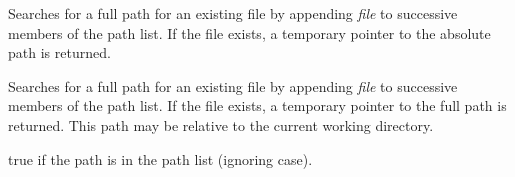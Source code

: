 

Searches for a full path for an existing file by appending {\it file} to
successive members of the path list.  If the file exists, a temporary
pointer to the absolute path is returned.



Searches for a full path for an existing file by appending {\it file} to
successive members of the path list.  If the file exists, a temporary
pointer to the full path is returned. This path may be relative to the current
working directory.



true if the path is in the path list (ignoring case).

